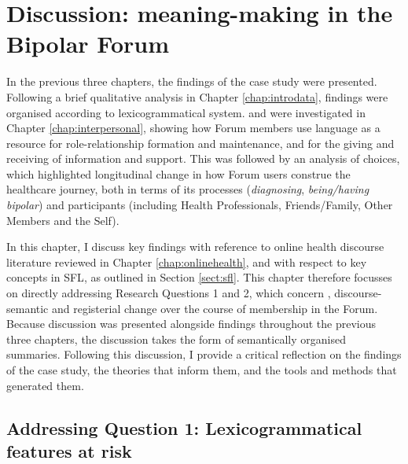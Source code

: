 
\chapter{Discussion: meaning-making in the Bipolar Forum} \label{chap:discuss-bp}

In the previous three chapters, the findings of the case study were presented. Following a brief qualitative analysis in Chapter \ref{chap:introdata}, findings were organised according to lexicogrammatical system.  and  were investigated in Chapter \ref{chap:interpersonal}, showing how \Gls{Forum} \glspl{member} use language as a resource for role\hyp{}relationship formation and maintenance, and for the giving and receiving of information and support. This was followed by an analysis of  choices, which highlighted longitudinal change in how \gls{Forum} users construe the healthcare journey, both in terms of its processes (\emph{diagnosing}, \emph{being\slash having bipolar}) and participants (including Health Professionals, Friends\slash Family, Other Members and the Self).

In this chapter, I discuss key findings with reference to online health discourse literature reviewed in Chapter \ref{chap:onlinehealth}, and with respect to key concepts in \gls{SFL}, as outlined in Section \ref{sect:sfl}. This chapter therefore focusses on directly addressing Research Questions 1 and 2, which concern , \gls{discourse-semantic} and registerial change over the course of membership in the \gls{Forum}. Because discussion was presented alongside findings throughout the previous three chapters, the discussion takes the form of semantically organised summaries. Following this discussion, I provide a critical reflection on the findings of the case study, the theories that inform them, and the tools and methods that generated them.

\section{Addressing Question 1: Lexicogrammatical features at risk}

